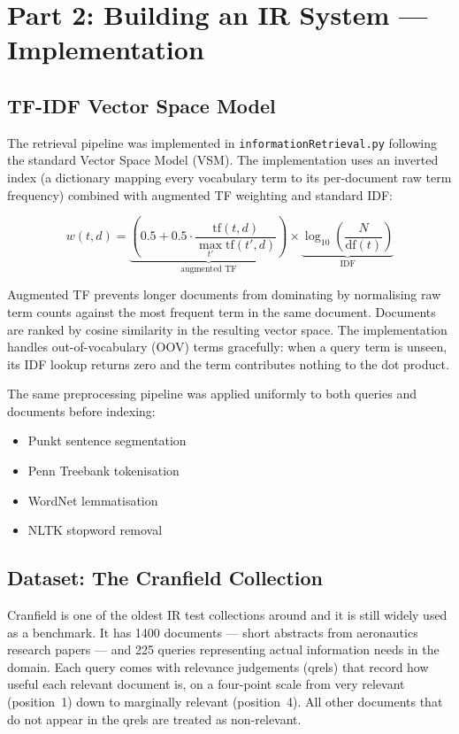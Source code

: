\documentclass{svproc}
\begin{document}
    \section{Part 2: Building an IR System — Implementation}

    \subsection{TF-IDF Vector Space Model}

    The retrieval pipeline was implemented in \texttt{informationRetrieval.py} following the standard Vector Space Model (VSM). The implementation uses an inverted index (a dictionary mapping every vocabulary term to its per-document raw term frequency) combined with augmented TF weighting and standard IDF:

    \[
    w(t, d) = \underbrace{\left(0.5 + 0.5 \cdot \frac{\mathrm{tf}(t,d)}{\max_{t'}\mathrm{tf}(t',d)}\right)}_{\text{augmented TF}} \times \underbrace{\log_{10}\!\left(\frac{N}{\mathrm{df}(t)}\right)}_{\text{IDF}}
    \]

    Augmented TF prevents longer documents from dominating by normalising raw term counts against the most frequent term in the same document. Documents are ranked by cosine similarity in the resulting vector space. The implementation handles out-of-vocabulary (OOV) terms gracefully: when a query term is unseen, its IDF lookup returns zero and the term contributes nothing to the dot product.

    The same preprocessing pipeline was applied uniformly to both queries and documents before indexing:
    \begin{itemize}[noitemsep]
        \item Punkt sentence segmentation
        \item Penn Treebank tokenisation
        \item WordNet lemmatisation
        \item NLTK stopword removal
    \end{itemize}

    \subsection{Dataset: The Cranfield Collection}

    Cranfield is one of the oldest IR test collections around and it is still widely used as a benchmark. It has 1400 documents --- short abstracts from aeronautics research papers --- and 225 queries representing actual information needs in the domain. Each query comes with relevance judgements (qrels) that record how useful each relevant document is, on a four-point scale from very relevant (position~1) down to marginally relevant (position~4). All other documents that do not appear in the qrels are treated as non-relevant.
\end{document}

